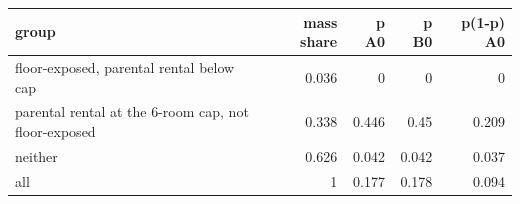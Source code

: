 \begin{tabular}{lrrrr}
\toprule
group & mass share & p A0 & p B0 & p(1-p) A0 \\
\midrule
floor-exposed, parental rental below cap & 0.036 & 0 & 0 & 0 \\
parental rental at the 6-room cap, not floor-exposed & 0.338 & 0.446 & 0.45 & 0.209 \\
neither & 0.626 & 0.042 & 0.042 & 0.037 \\
all & 1 & 0.177 & 0.178 & 0.094 \\
\bottomrule
\end{tabular}
